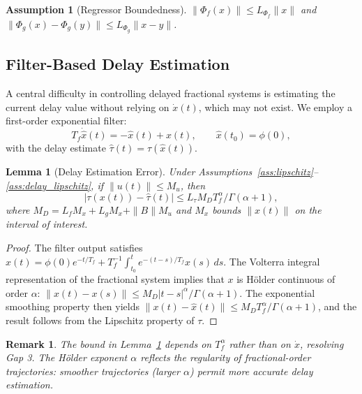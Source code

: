 \documentclass[12pt,a4paper]{article}
\newtheorem{lemma}[theorem]{Lemma}
\newtheorem{remark}{Remark}
\newtheorem{assumption}{Assumption}
\begin{document}
\begin{assumption}[Regressor Boundedness]
\label{ass:regressor_bound}
$\|\Phi_f(x)\| \leq L_{\Phi_f}\|x\|$ and $\|\Phi_g(x) - \Phi_g(y)\| \leq L_{\Phi_g}\|x-y\|$.
\end{assumption}

\subsection{Filter-Based Delay Estimation}

A central difficulty in controlling delayed fractional systems is estimating the current delay value without relying on $\dot{x}(t)$, which may not exist. We employ a first-order exponential filter:
\begin{equation}
\label{eq:delay_estimator}
T_f \dot{\hat{x}}(t) = -\hat{x}(t) + x(t), \qquad \hat{x}(t_0) = \phi(0),
\end{equation}
with the delay estimate $\hat{\tau}(t) = \tau(\hat{x}(t))$.

\begin{lemma}[Delay Estimation Error]
\label{lem:delay_error}
Under Assumptions~\ref{ass:lipschitz}--\ref{ass:delay_lipschitz}, if $\|u(t)\| \leq M_u$, then
\begin{equation}
|\tau(x(t)) - \hat{\tau}(t)| \leq L_{\tau} M_D T_f^{\alpha} / \Gamma(\alpha+1),
\end{equation}
where $M_D = L_f M_x + L_g M_x + \|B\|M_u$ and $M_x$ bounds $\|x(t)\|$ on the interval of interest.
\end{lemma}

\begin{proof}
The filter output satisfies $\hat{x}(t) = \phi(0)e^{-t/T_f} + T_f^{-1}\int_{t_0}^{t} e^{-(t-s)/T_f} x(s)\,ds$. The Volterra integral representation of the fractional system implies that $x$ is H\"{o}lder continuous of order $\alpha$: $\|x(t) - x(s)\| \leq M_D|t-s|^{\alpha}/\Gamma(\alpha+1)$. The exponential smoothing property then yields $\|x(t) - \hat{x}(t)\| \leq M_D T_f^{\alpha}/\Gamma(\alpha+1)$, and the result follows from the Lipschitz property of $\tau$.
\end{proof}

\begin{remark}
The bound in Lemma~\ref{lem:delay_error} depends on $T_f^{\alpha}$ rather than on $\dot{x}$, resolving Gap 3. The H\"{o}lder exponent $\alpha$ reflects the regularity of fractional-order trajectories: smoother trajectories (larger $\alpha$) permit more accurate delay estimation.
\end{remark}
\end{document}

